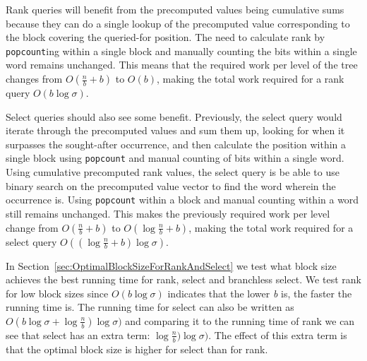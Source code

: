 Rank queries will benefit from the precomputed values being cumulative sums because they can do a single lookup of the precomputed value corresponding to the block covering the queried-for position.
The need to calculate rank by \texttt{popcount}ing within a single block and manually counting the bits within a single word remains unchanged.
This means that the required work per level of the tree changes from $O(\frac{n}{b}+b)$ to $O(b)$, making the total work required for a rank query $O(b \log \sigma)$.

Select queries should also see some benefit.
Previously, the select query would iterate through the precomputed values and sum them up, looking for when it surpasses the sought-after occurrence, and then calculate the position within a single block using \texttt{popcount} and manual counting of bits within a single word.
Using cumulative precomputed rank values, the select query is be able to use binary search on the precomputed value vector to find the word wherein the occurrence is.
Using \texttt{popcount} within a block and manual counting within a word still remains unchanged.
This makes the previously required work per level change from $O(\frac{n}{b} + b)$ to $O(\log \frac{n}{b} + b)$, making the total work required for a select query $O((\log \frac{n}{b} + b) \log \sigma)$.

In Section~\ref{sec:OptimalBlockSizeForRankAndSelect} we test what block size achieves the best running time for rank, select and branchless select.
We test rank for low block sizes since $O(b \log \sigma)$ indicates that the lower \textit{b} is, the faster the running time is.
The running time for select can also be written as $O(b \log \sigma + \log \frac{n}{b}) \log \sigma)$ and comparing it to the running time of rank we can see that select has an extra term: $\log \frac{n}{b}) \log \sigma)$.
The effect of this extra term is that the optimal block size is higher for select than for rank.

